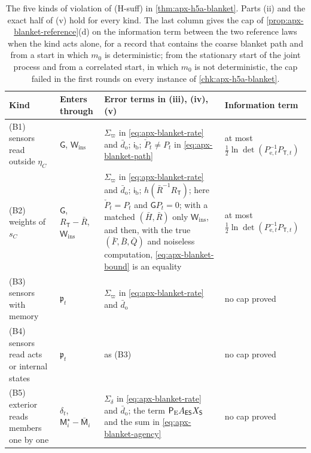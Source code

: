 \begin{table}[t]
\centering\small
\caption{The five kinds of violation of (H-suff) in \cref{thm:apx-h5a-blanket}. Parts (ii) and the exact half of (v) hold for every kind. The last column gives the cap of \cref{prop:apx-blanket-reference}(d) on the information term between the two reference laws when the kind acts alone, for a record that contains the coarse blanket path and from a start in which $m_0$ is deterministic; from the stationary start of the joint process and from a correlated start, in which $m_0$ is not deterministic, the cap failed in the first rounds on every instance of \cref{chk:apx-h5a-blanket}.}
\label{tab:apx-blanket-kinds}
\begin{tabular}{@{}>{\raggedright\arraybackslash}p{}>{\raggedright\arraybackslash}p{}>{\raggedright\arraybackslash}p{}>{\raggedright\arraybackslash}p{}@{}}
\toprule
Kind & Enters through & Error terms in (iii), (iv), (v) & Information term\\
\midrule
(B1) sensors read outside $\eta_C$ & $\mathsf G$, $\mathsf W_{\mathrm{ins}}$ & $\Sigma_\varpi$ in \eqref{eq:apx-blanket-rate} and $\bar d_{\mathrm o}$; $\mathsf i_{\mathrm b}$; $\check P_t\ne P_t$ in \eqref{eq:apx-blanket-path} & at most $\frac12\ln\det(P_{\mathrm e,t}^{-1}P_{\mathsf T,t})$\\
(B2) weights of $s_C$ & $\mathsf G$, $R_{\mathsf T}-\bar R$, $\mathsf W_{\mathrm{ins}}$ & $\Sigma_\varpi$ in \eqref{eq:apx-blanket-rate} and $\bar d_{\mathrm o}$; $\mathsf i_{\mathrm b}$; $h(\bar R^{-1}R_{\mathsf T})$; here $\check P_t=P_t$ and $\mathsf GP_t=0$; with a matched $(\bar H,\bar R)$ only $\mathsf W_{\mathrm{ins}}$, and then, with the true $(\bar F,\bar B,\bar Q)$ and noiseless computation, \eqref{eq:apx-blanket-bound} is an equality & at most $\frac12\ln\det(P_{\mathrm e,t}^{-1}P_{\mathsf T,t})$\\
(B3) sensors with memory & $\mathfrak p_t$ & $\Sigma_\varpi$ in \eqref{eq:apx-blanket-rate} and $\bar d_{\mathrm o}$ & no cap proved\\
(B4) sensors read acts or internal states & $\mathfrak p_t$ & as (B3) & no cap proved\\
(B5) exterior reads members one by one & $\delta_t$, $\mathsf M^\star_i-\bar{\mathsf M}_i$ & $\Sigma_\delta$ in \eqref{eq:apx-blanket-rate} and $\bar d_{\mathrm o}$; the term $\mathsf P_{\mathrm E}A_{\mathsf{E}\mathsf{S}}X_{\mathsf{S}}$ and the sum in \eqref{eq:apx-blanket-agency} & no cap proved\\
\bottomrule
\end{tabular}
\end{table}

